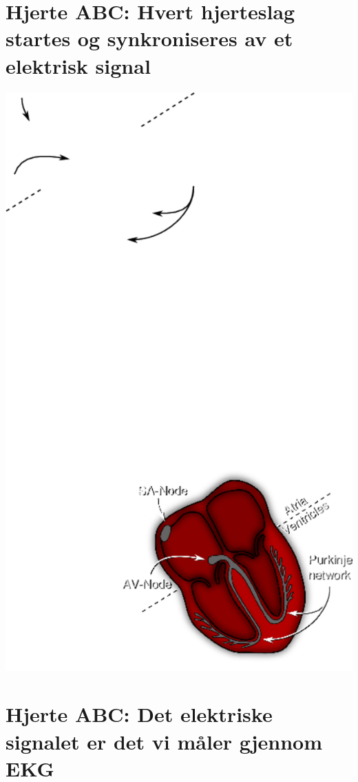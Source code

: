 \documentclass[%
oneside,                 %
final,                   %
10pt,norsk]{article}
\begin{document}
\noindent

\section*{Hjerte ABC: Hvert hjerteslag startes og synkroniseres av et elektrisk signal}



\centerline{\includegraphics[width=0.9\linewidth]{fig/heart_scetch.pdf}}




\section*{Hjerte ABC: Det elektriske signalet er det vi måler gjennom EKG}
\end{document}
